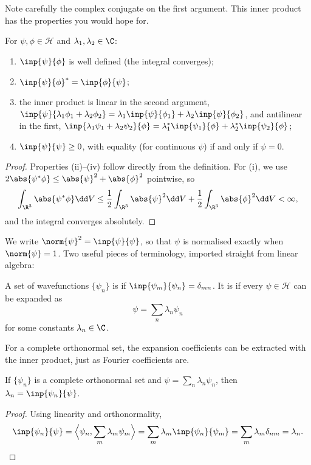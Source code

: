 Note carefully the complex conjugate on the first argument. This inner product has the properties you would hope for.

\begin{proposition}
    For $\psi, \phi \in \mathcal{H}$ and $\lambda_1, \lambda_2 \in \C$:
    \begin{enumerate}[label=(\roman*)]
        \item $\inp{\psi}{\phi}$ is well defined (the integral converges);
        \item $\inp{\psi}{\phi}^* = \inp{\phi}{\psi}$;
        \item the inner product is linear in the second argument, $\inp{\psi}{\lambda_1 \phi_1 + \lambda_2 \phi_2} = \lambda_1 \inp{\psi}{\phi_1} + \lambda_2 \inp{\psi}{\phi_2}$, and antilinear in the first, $\inp{\lambda_1 \psi_1 + \lambda_2 \psi_2}{\phi} = \lambda_1^* \inp{\psi_1}{\phi} + \lambda_2^* \inp{\psi_2}{\phi}$;
        \item $\inp{\psi}{\psi} \geq 0$, with equality (for continuous $\psi$) if and only if $\psi = 0$.
    \end{enumerate}
\end{proposition}
\begin{proof}
    Properties (ii)--(iv) follow directly from the definition. For (i), we use $2\abs{\psi^* \phi} \leq \abs{\psi}^2 + \abs{\phi}^2$ pointwise, so
    $$
    \int_{\R^3} \abs{\psi^* \phi} \dd V \leq \frac{1}{2} \int_{\R^3} \abs{\psi}^2 \dd V + \frac{1}{2}\int_{\R^3} \abs{\phi}^2 \dd V < \infty,
    $$
    and the integral converges absolutely.
\end{proof}

We write $\norm{\psi}^2 = \inp{\psi}{\psi}$, so that $\psi$ is normalised exactly when $\norm{\psi} = 1$. Two useful pieces of terminology, imported straight from linear algebra:

\begin{definition}
    A set of wavefunctions $\{\psi_n\}$ is  if $\inp{\psi_m}{\psi_n} = \delta_{mn}$. It is  if every $\psi \in \mathcal{H}$ can be expanded as
    $$
    \psi = \sum_n \lambda_n \psi_n
    $$
    for some constants $\lambda_n \in \C$.
\end{definition}

For a complete orthonormal set, the expansion coefficients can be extracted with the inner product, just as Fourier coefficients are.

\begin{proposition}
    If $\{\psi_n\}$ is a complete orthonormal set and $\psi = \sum_n \lambda_n \psi_n$, then $\lambda_n = \inp{\psi_n}{\psi}$.
\end{proposition}
\begin{proof}
    Using linearity and orthonormality,
    $$
    \inp{\psi_n}{\psi} = \Big\langle \psi_n, \sum_m \lambda_m \psi_m \Big\rangle = \sum_m \lambda_m \inp{\psi_n}{\psi_m} = \sum_m \lambda_m \delta_{nm} = \lambda_n. \qedhere
    $$
\end{proof}

